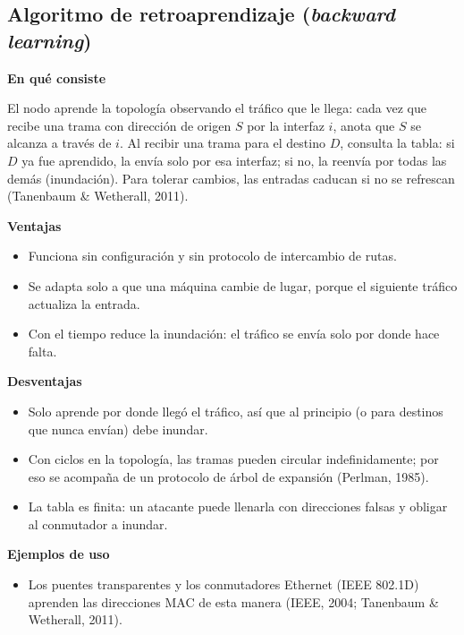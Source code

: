 \documentclass[12pt,letterpaper]{article}
\newcommand{\rub}[1]{\par\medskip\noindent\textbf{#1}\par\nopagebreak}
\begin{document}
\subsection{Algoritmo de retroaprendizaje (\emph{backward learning})}
\rub{En qué consiste}
El nodo aprende la topología observando el tráfico que le llega: cada vez que recibe una trama con dirección de origen $S$ por la interfaz $i$, anota que $S$ se alcanza a través de $i$. Al recibir una trama para el destino $D$, consulta la tabla: si $D$ ya fue aprendido, la envía solo por esa interfaz; si no, la reenvía por todas las demás (inundación). Para tolerar cambios, las entradas caducan si no se refrescan (Tanenbaum \& Wetherall, 2011).
\rub{Ventajas}
\begin{itemize}[itemsep=2pt]
\item Funciona sin configuración y sin protocolo de intercambio de rutas.
\item Se adapta solo a que una máquina cambie de lugar, porque el siguiente tráfico actualiza la entrada.
\item Con el tiempo reduce la inundación: el tráfico se envía solo por donde hace falta.
\end{itemize}
\rub{Desventajas}
\begin{itemize}[itemsep=2pt]
\item Solo aprende por donde llegó el tráfico, así que al principio (o para destinos que nunca envían) debe inundar.
\item Con ciclos en la topología, las tramas pueden circular indefinidamente; por eso se acompaña de un protocolo de árbol de expansión (Perlman, 1985).
\item La tabla es finita: un atacante puede llenarla con direcciones falsas y obligar al conmutador a inundar.
\end{itemize}
\rub{Ejemplos de uso}
\begin{itemize}[itemsep=2pt]
\item Los puentes transparentes y los conmutadores Ethernet (IEEE 802.1D) aprenden las direcciones MAC de esta manera (IEEE, 2004; Tanenbaum \& Wetherall, 2011).
\end{itemize}
\end{document}
